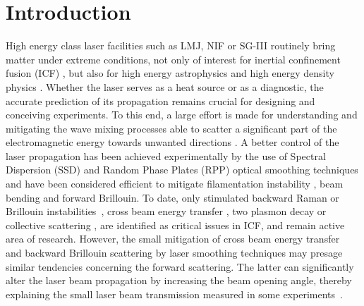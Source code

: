 \documentclass[
 reprint,
 superscriptaddress,
 amsmath,amssymb,
 aps,
]{revtex4-1}
\begin{document}
\section{Introduction}
High energy class laser facilities such as LMJ,  NIF or SG-III routinely bring matter under extreme conditions, not only of interest for inertial confinement fusion (ICF) \cite{Cavailler_2005,Lindl_2004,MRE_Zheng_2017}, but also for high energy astrophysics  and high energy density physics   \cite{Drake2006}. 
Whether the laser serves as a heat source or as a diagnostic, the accurate prediction of its propagation remains crucial for designing and  conceiving experiments. 
To this end, a large effort is made for understanding and mitigating the wave mixing processes able to scatter a significant part of the electromagnetic energy towards unwanted directions \cite[]{Shen_1965,Forslund_1973}. A better control of the laser propagation has been achieved experimentally by the use of Spectral Dispersion (SSD) and  Random Phase Plates (RPP) optical smoothing techniques\cite[]{Kato_1984,Skupski_1989,NatPhys_Glenzer,NatPhys_Labaune} and have been considered efficient to mitigate filamentation instability \cite[]{phd_Michel,POP_Michel_2003,Lushnikov_2006,PRL_Sarri_2011}, beam bending\cite[]{PRL_Hinkel_1996,
POP_Bezzerides_1998,PRL_Young_1998,POP_Ruyer_2020} and forward Brillouin.
To date, only stimulated backward Raman or Brillouin instabilities~\cite{POP_Liu_2009,hao_2013},  cross beam energy transfer \cite{hao_2016}, two plasmon decay \cite[]{Dubois_1995,Russell_2001} or collective scattering  \cite[]{PRL_Neuville_2016,PRL_Depierreux_2016}, are identified as critical issues in ICF, and remain active area of research. However, the small mitigation of cross beam energy transfer~\cite{PRL_Neuville_2016cbet} and backward Brillouin scattering by laser smoothing techniques may presage similar tendencies concerning the forward scattering. %
The latter can significantly alter the laser beam propagation by increasing the beam opening angle, thereby explaining the small laser beam transmission measured in some experiments~\cite{POP_Rousseaux_2015}.
\end{document}
